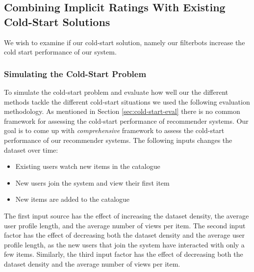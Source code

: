 \subsection{Combining Implicit Ratings With Existing Cold-Start Solutions}


We wish to examine if our cold-start solution, namely our filterbots increase the cold start performance
of our system.



\subsubsection{Simulating the Cold-Start Problem}

To simulate the cold-start problem and evaluate how well our the different
methods tackle the different cold-start situations we used the following
evaluation methodology. As mentioned in Section \ref{sec:cold-start-eval} there is
no common framework for assessing the cold-start performance of recommender systems.
Our goal is to come up with \emph{comprehensive} framework to assess the cold-start
performance of our recommender systems. The following inputs changes the dataset over time:

\begin{itemize}
	\item 	Existing users watch new items in the catalogue
	\item	New users join the system and view their first item
	\item	New items are added to the catalogue
\end{itemize}

The first input source has the effect of increasing the dataset density, the average user
profile length, and the average number of views per item. The second input factor has
the effect of decreasing both the dataset density and the average user profile length,
as the new users that join the system have interacted with only a few items. Similarly,
the third input factor has the effect of decreasing both the dataset density and the average number of
views per item.

